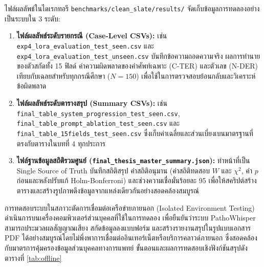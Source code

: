 ไฟล์ผลลัพธ์ในไดเรกทอรี \texttt{benchmarks/clean\_slate/results/} จัดเก็บข้อมูลการทดลองอย่างเป็นระบบใน 3 ระดับ:
\begin{enumerate}
    \item \textbf{ไฟล์ผลลัพธ์ระดับรายกรณี (Case-Level CSVs):} เช่น \texttt{exp4\_lora\_evaluation\_test\_seen.csv} และ \texttt{exp4\_lora\_evaluation\_test\_unseen.csv} บันทึกข้อความถอดความจริง ผลการทำนายของตัวสกัดทั้ง 15 ฟิลด์ ค่าความผิดพลาดของคำศัพท์เฉพาะ (C-TER) และตัวเลข (N-DER) เทียบกับเฉลยสำหรับทุกกรณีศึกษา ($N = 150$) เพื่อใช้ในการตรวจสอบย้อนกลับและวิเคราะห์ข้อผิดพลาด
    \item \textbf{ไฟล์ผลลัพธ์ระดับตารางสรุป (Summary CSVs):} เช่น \texttt{final\_table\_system\_progression\_test\_seen.csv}, \texttt{final\_table\_prompt\_ablation\_test\_seen.csv} และ \texttt{final\_table\_15fields\_test\_seen.csv} ซึ่งเก็บค่าเฉลี่ยและส่วนเบี่ยงเบนมาตรฐานที่ตรงกับตารางในบทที่ 4 ทุกประการ
    \item \textbf{ไฟล์ฐานข้อมูลสถิติรวมศูนย์ (\texttt{final\_thesis\_master\_summary.json}):} ทำหน้าที่เป็น Single Source of Truth บันทึกสถิติสรุป ค่าสถิติอนุมาน (ค่าสถิติทดสอบ $W$ และ $\chi^2$, ค่า $p$ ก่อนและหลังปรับแก้ Holm-Bonferroni) และช่วงความเชื่อมั่นร้อยละ 95 เพื่อให้สคริปต์สร้างตารางและสร้างรูปภาพดึงข้อมูลจากแหล่งเดียวกันอย่างสอดคล้องสมบูรณ์
\end{enumerate}



การทดสอบระบบในสภาวะตัดการเชื่อมต่อเครือข่ายภายนอก (Isolated Environment Testing) ดำเนินการบนเครื่องคอมพิวเตอร์ส่วนบุคคลที่ใช้ในการทดลอง เพื่อยืนยันว่าระบบ PathoWhisper สามารถประมวลผลสัญญาณเสียง สกัดข้อมูลลงแบบฟอร์ม และสร้างรายงานสรุปในรูปแบบเอกสาร PDF ได้อย่างสมบูรณ์โดยไม่พึ่งพาการเชื่อมต่ออินเทอร์เน็ตหรือบริการคลาวด์ภายนอก ซึ่งสอดคล้องกับมาตรการคุ้มครองข้อมูลส่วนบุคคลทางการแพทย์ ขั้นตอนและผลการทดสอบเชิงฟังก์ชันสรุปดังตารางที่ \ref{tab:offline}

